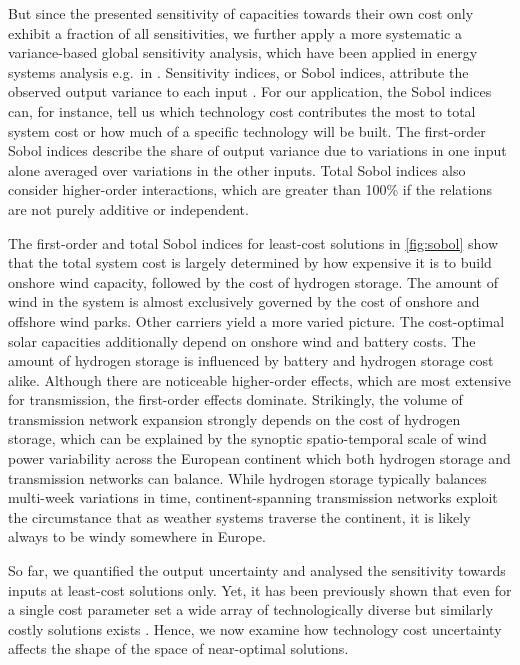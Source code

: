 But since the presented sensitivity of capacities towards their own cost only
exhibit a fraction of all sensitivities, we further apply a more systematic a
variance-based global sensitivity analysis, which have been applied in energy
systems analysis e.g.~in
\cite{trondle_trade-offs_2020,mavromatidis_uncertainty_2018}. Sensitivity
indices, or Sobol indices, attribute the observed output variance to each input
\cite{sudret_global_2008}. For our application, the Sobol indices can, for
instance, tell us which technology cost contributes the most to total system
cost or how much of a specific technology will be built. The first-order Sobol
indices describe the share of output variance due to variations in one input
alone averaged over variations in the other inputs. Total Sobol indices also
consider higher-order interactions, which are greater than 100\% if the
relations are not purely additive or independent.

The first-order and total Sobol indices for least-cost solutions in
\cref{fig:sobol} show that the total system cost is largely determined by how
expensive it is to build onshore wind capacity, followed by the cost of hydrogen
storage. The amount of wind in the system is almost exclusively governed by the
cost of onshore and offshore wind parks. Other carriers yield a more varied
picture. The cost-optimal solar capacities additionally depend on onshore wind
and battery costs. The amount of hydrogen storage is influenced by battery and
hydrogen storage cost alike. Although there are noticeable higher-order effects,
which are most extensive for transmission, the first-order effects dominate.
Strikingly, the volume of transmission network expansion strongly depends on the
cost of hydrogen storage, which can be explained by the synoptic spatio-temporal
scale of wind power variability across the European continent which both
hydrogen storage and transmission networks can balance. While hydrogen storage
typically balances multi-week variations in time, continent-spanning
transmission networks exploit the circumstance that as weather systems traverse
the continent, it is likely always to be windy somewhere in Europe.


So far, we quantified the output uncertainty and analysed the sensitivity
towards inputs at least-cost solutions only. Yet, it has been previously shown
that even for a single cost parameter set a wide array of technologically
diverse but similarly costly solutions exists \cite{nearoptimal}. Hence, we now
examine how technology cost uncertainty affects the shape of the space of
near-optimal solutions.

